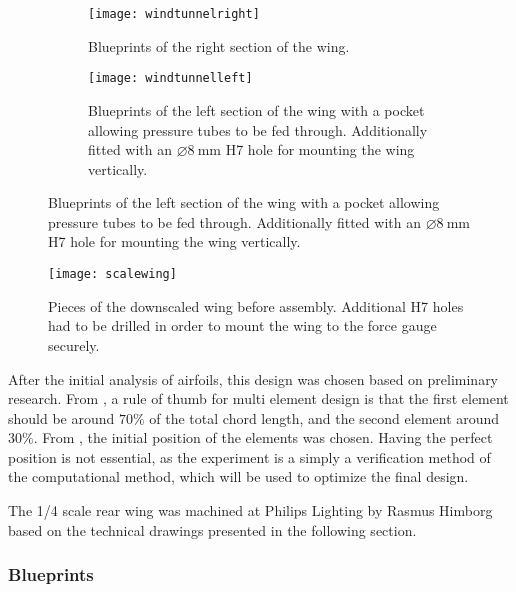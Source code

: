     \begin{figure}
      \begin{subfigure}[b]{\textwidth}
        \texttt{[image: windtunnelright]}
        \caption{Blueprints of the right section of the wing.}
        \label{fig:scalewingblueprintright}
      \end{subfigure}

      \begin{subfigure}[b]{\textwidth}
        \texttt{[image: windtunnelleft]}
        \caption{Blueprints of the left section of the wing with a pocket allowing pressure tubes to be fed through. Additionally fitted with an $\diameter \SI{8}{\milli\metre}$ H7 hole for mounting the wing vertically.}
        \label{fig:scalewingblueprintleft}
      \end{subfigure}
    \end{figure}

    \begin{figure}
      \texttt{[image: scalewing]}
      \caption{Pieces of the downscaled wing before assembly. Additional H7 holes had to be drilled in order to mount the wing to the force gauge securely.}
      \label{fig:scalewingparts}
    \end{figure}

    After the initial analysis of airfoils, this design was chosen based on preliminary research. From \cite{winginitialangle}, a rule of thumb for multi element design is that the first element should be around $70\%$ of the total chord length, and the second element around $30\%$. From \cite{jkatz}, the initial position of the elements was chosen. Having the perfect position is not essential, as the experiment is a simply a verification method of the computational method, which will be used to optimize the final design.

    The 1/4 scale rear wing was machined at Philips Lighting by Rasmus Himborg based on the technical drawings presented in the following section.

    \subsubsection{Blueprints}

